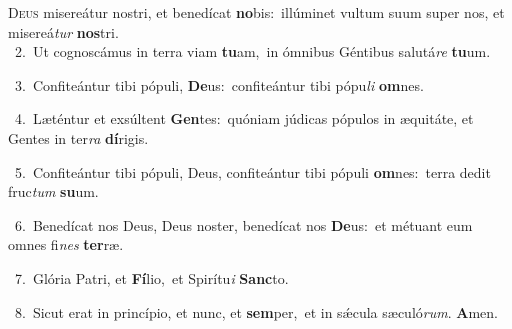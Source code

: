 \lettrine{\initial\textcolor{\initialcolor}{D}}{eus} misereátur nostri, et benedícat \textbf{no}\-bis:~\star illúminet vultum suum super nos, et misereá\textit{tur} \textbf{nos}\-tri.\\
{\numbfont\textcolor{\numbcolor}{~2.}}~Ut cognoscámus in terra viam \textbf{tu}\-am,~\star in ómnibus Géntibus salutá\textit{re} \textbf{tu}\-um.\par
{\numbfont\textcolor{\numbcolor}{~3.}}~Confiteántur tibi pópuli, \textbf{De}\-us:~\star confiteántur tibi pópu\textit{li} \textbf{om}\-nes.\par
{\numbfont\textcolor{\numbcolor}{~4.}}~Læténtur et exsúltent \textbf{Gen}\-tes:~\star quóniam júdicas pópulos in æquitáte, et Gentes in ter\textit{ra} \textbf{dí}\-rigis.\par
{\numbfont\textcolor{\numbcolor}{~5.}}~Confiteántur tibi pópuli, Deus, confiteántur tibi pópuli \textbf{om}\-nes:~\star terra dedit fruc\textit{tum} \textbf{su}\-um.\par
{\numbfont\textcolor{\numbcolor}{~6.}}~Benedícat nos Deus, Deus noster, benedícat nos \textbf{De}\-us:~\star et métuant eum omnes fi\textit{nes} \textbf{ter}\-ræ.\par
{\numbfont\textcolor{\numbcolor}{~7.}}~Glória Patri, et \textbf{Fí}\-lio,~\star et Spirítu\textit{i} \textbf{Sanc}\-to.\par
{\numbfont\textcolor{\numbcolor}{~8.}}~Sicut erat in princípio, et nunc, et \textbf{sem}\-per,~\star et in sǽcula sæculó\-\textit{rum}\-. \textbf{A}\-men.\par
